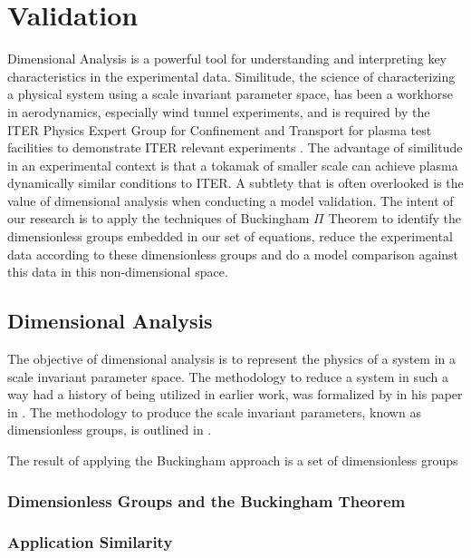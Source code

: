 \section{Validation}\label{sec:ValidationStrategy}

Dimensional Analysis \cite{Buckingham1914} is a powerful tool for understanding and interpreting key characteristics in the experimental data. Similitude, the science of characterizing a physical system using a scale invariant parameter space, has been a workhorse in aerodynamics, especially wind tunnel experiments, and is required by the ITER Physics Expert Group for Confinement and Transport for plasma test facilities to demonstrate ITER relevant experiments \cite{Connor1977}. The advantage of similitude in an experimental context is that a tokamak of smaller scale can achieve plasma dynamically similar conditions to ITER. A subtlety that is often overlooked is the value of dimensional analysis when conducting a model validation. The intent of our research is to apply the techniques of Buckingham $\Pi$ Theorem to identify the dimensionless groups embedded in our set of equations, reduce the experimental data according to these dimensionless groups and do a model comparison against this data in this non-dimensional space.

\subsection{Dimensional Analysis} \label{sub:DimensionalAnalysis}

The objective of dimensional analysis is to represent the physics of a system in a scale invariant parameter space. The methodology to reduce a system in such a way had a history of being utilized in earlier work, was formalized by \citeauthor{Buckingham1914} in his paper  in \citeyear{Buckingham1914} \cite{Buckingham1914}. The methodology to produce the scale invariant parameters, known as dimensionless groups, is outlined in .

The result of applying the Buckingham approach is a set of dimensionless groups 

\subsubsection{Dimensionless Groups and the Buckingham Theorem} \label{subsub:BuckinghamPiTheorem}

\subsubsection{Application Similarity} \label{subsub:Similarity}

